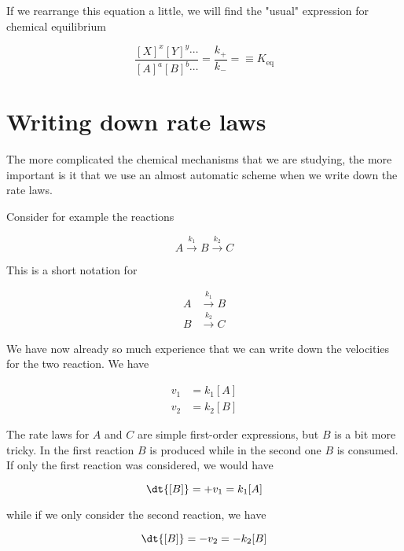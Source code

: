 If we rearrange this equation a little, we will find the "usual" expression for chemical equilibrium \ie

\begin{equation}
    \frac{[X]^x[Y]^y \cdots}{[A]^a[B]^b \cdots} = \frac{k_+}{k_-} = \equiv K_{\mathrm{eq}}
\end{equation}

\section{Writing down rate laws}

The more complicated the chemical mechanisms that we are studying, the more important is it that we use an almost automatic scheme when we write down the rate laws.

Consider for example the reactions

\begin{equation}
    A \overset{k_1}{\rightarrow} B \overset{k_2}{\rightarrow} C
\end{equation}

This is a short notation for

\begin{align*}
    A &\overset{k_1}{\rightarrow} B \\
    B &\overset{k_2}{\rightarrow} C
\end{align*}

We have now already so much experience that we can write down the velocities for the two reaction. We have

\begin{subequations}
    \begin{align}
        v_1 &= k_1 [A] \\
        v_2 &= k_2 [B]
    \end{align}
\end{subequations}

The rate laws for $A$ and $C$ are simple first-order expressions, but $B$ is a bit more tricky. In the first reaction $B$ is produced while in the second one $B$ is consumed. If only the first reaction was considered, we would have

\begin{equation}
    \dt{[B]} = +v_1 = k_1[A]
\end{equation}

while if we only consider the second reaction, we have

\begin{equation}
    \dt{[B]} = -v_2 = -k_2[B]
\end{equation}

